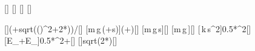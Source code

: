 [\kg]
[\meter]
[\Npm]
[\mpss]

[]{(\mJX*\gX+sqrt((\mJX*\gX)^2+2*\kSX*\mJX*\gX*\lSX))/\kSX}[\meter]
[m\,g\,(\ell+s)]{\mJX*\gX*(\lSX+\sSX)}[\joule]
[m\,g\,s]{\mJX*\gX*\sSX}[\joule]
[m\,g\,\ell]{\mJX*\gX*\lSX}[\joule]
[\,k\,s^2]{0.5*\kSX*\sSX^2}[\joule]
[E_+E_]{0.5*\kSX*\sSX^2+\mJX*\gX*\lSX}[\joule]
[]{sqrt(2*\gX*\lSX)}[\mps]
